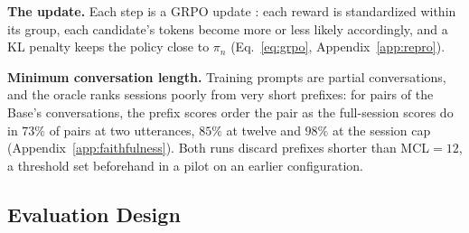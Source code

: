 \textbf{The update.} Each step is a GRPO update \citep{shao2024deepseekmath}: each reward is
standardized within its group, each candidate's tokens become more or less likely accordingly,
and a KL penalty keeps the policy close to $\pi_n$ (Eq.~\ref{eq:grpo}, Appendix~\ref{app:repro}).

\textbf{Minimum conversation length.} Training prompts are partial conversations, and the oracle
ranks sessions poorly from very short prefixes: for pairs of the Base's conversations, the prefix
scores order the pair as the full-session scores do in $73\%$ of pairs at two utterances, $85\%$ at
twelve and $98\%$ at the session cap (Appendix~\ref{app:faithfulness}).
Both runs discard prefixes shorter than MCL${=}12$, a threshold set beforehand in a pilot on an
earlier configuration.

\subsection{Evaluation Design}
\label{sec:setup}

